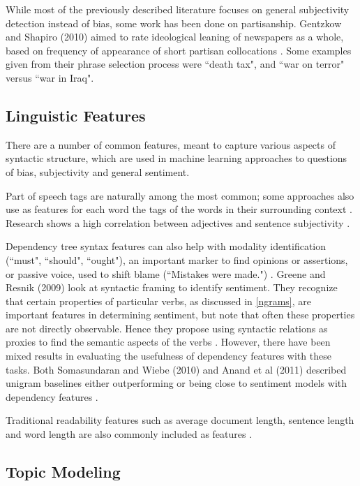 \documentclass[11pt, a4paper]{article}
\begin{document}
While most of the previously described literature focuses on general subjectivity detection instead of bias, some work has been done on partisanship. Gentzkow and Shapiro (2010) aimed to rate ideological leaning of newspapers as a whole, based on frequency of appearance of short partisan collocations \cite{gentzkow2010whatdrives}. Some examples given from their phrase selection process were ``death tax", and ``war on terror" versus ``war in Iraq".

\subsection{Linguistic Features}

There are a number of common features, meant to capture various aspects of syntactic structure, which are used in machine learning approaches to questions of bias, subjectivity and general sentiment.

Part of speech tags are naturally among the most common; some approaches also use as features for each word the tags of the words in their surrounding context \cite{recasens2013linguistic}. Research shows a high correlation between adjectives and sentence subjectivity \cite{pang2008opinion}.

Dependency tree syntax features can also help with modality identification (``must", ``should", ``ought"), an important marker to find opinions or assertions, or passive voice, used to shift blame (``Mistakes were made.") \cite{somasundaran2010recognizing} \cite{pang2008opinion}. Greene and Resnik (2009) look at syntactic framing to identify sentiment. They recognize that certain properties of particular verbs, as discussed in \ref{ngrams}, are important features in determining sentiment, but note that often these properties are not directly observable. Hence they propose using syntactic relations as proxies to find the semantic aspects of the verbs \cite{greene2009syntactic}. However, there have been mixed results in evaluating the usefulness of dependency features with these tasks. Both Somasundaran and Wiebe (2010) and Anand et al (2011) described unigram baselines either outperforming or being close to sentiment models with dependency features \cite{somasundaran2010recognizing} \cite{anand2011classifying}.

Traditional readability features such as average document length, sentence length and word length are also commonly included as features \cite{leban2014news}.

\subsection{Topic Modeling}
\end{document}
